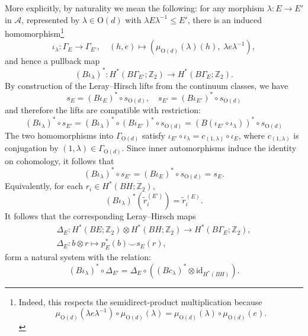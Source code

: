 \documentclass[aps,prx,reprint,superscriptaddress,twocolumn,amsmath,amssymb,amsfonts, nofootinbib]{revtex4-2}
\theoremstyle{apsstyle}
\begin{document}
More explicitly, by naturality we mean the following: for any morphism $\lambda:E\to E'$ in $\mathcal A$, represented by $\lambda\in \mathrm{O}(d)$ with $\lambda E\lambda^{-1}\le E'$, there is an induced homomorphism\footnote{Indeed, this respects the semidirect-product multiplication because
\begin{equation*}
\mu_{\mathrm O(d)}(\lambda e\lambda^{-1}) \circ \mu_{\mathrm O(d)}(\lambda)
= \mu_{\mathrm O(d)}(\lambda) \circ \mu_{\mathrm O(d)}(e).
\end{equation*}}
\begin{equation*}
\iota_\lambda:\Gamma_E\to \Gamma_{E'}, \quad (h,e)\mapsto (\mu_{\mathrm{O}(d)}(\lambda)(h),\; \lambda e \lambda^{-1}), 
\end{equation*}
and hence a pullback map
\begin{equation*}
     (B\iota_\lambda)^*:H^*(B\Gamma_{E'};\mathbb Z_2)\to H^*(B\Gamma_E;\mathbb Z_2).
\end{equation*}
By construction of the Leray–Hirsch lifts from the continuum classes, we have
\begin{equation*}
    s_E=(B\iota_E)^*\circ s_{\mathrm{O}(d)},\quad s_{E'}=(B\iota_{E'})^*\circ s_{\mathrm{O}(d)}
\end{equation*}
and therefore the lifts are compatible with restriction:
\begin{equation*}
    (B\iota_\lambda)^*\circ s_{E'} = (B\iota_{\lambda})^{*}\circ (B\iota_{E'})^{*}\circ s_{\mathrm{O}(d)} = (B(\iota_{E'}\circ \iota_{\lambda}))^{*}\circ s_{\mathrm{O}(d)}
\end{equation*}
The two homomorphisms into $\Gamma_{\mathrm O(d)}$ satisfy $\iota_{E'}\circ\iota_\lambda = c_{(1,\lambda)}\circ\iota_E$, where $c_{(1,\lambda)}$ is conjugation by $(1,\lambda)\in\Gamma_{\mathrm O(d)}$. Since inner automorphisms induce the identity on cohomology, it follows that
\begin{equation*}
    (B\iota_\lambda)^*\circ s_{E'} = (B\iota_E)^*\circ s_{\mathrm{O}(d)} =s_{E}.
\end{equation*}
Equivalently, for each $r_i\in H^*(BH;\mathbb Z_2)$,
\begin{equation*}
    (B\iota_\lambda)^*(\widetilde r_i^{(E')})=\widetilde r_i^{(E)}.
\end{equation*}
It follows that the corresponding Leray–Hirsch maps
\begin{gather*}
    \Delta_E:H^{*}(BE;\mathbb Z_2)\otimes H^{*}(BH;\mathbb Z_2)\to H^{* }(B\Gamma_E;\mathbb Z_2),\\
    \Delta_E: b\otimes r \longmapsto p_{E}^{*}(b)\smile s_E(r),
\end{gather*}
form a natural system with the relation:
\begin{equation*}
    (B\iota_\lambda)^*\circ \Delta_{E'} = \Delta_{E}\circ ((Bc_\lambda)^{*}\otimes \mathrm{id}_{H^{*}(BH)}). 
\end{equation*}
\end{document}
